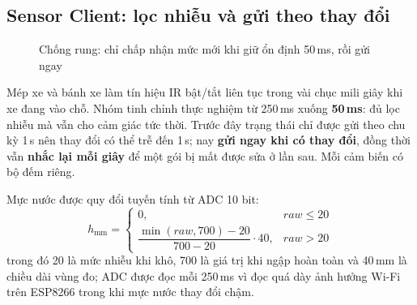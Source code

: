 \subsection{Sensor Client: lọc nhiễu và gửi theo thay đổi}
\begin{figure}[H]
\centering
{}
\caption{Chống rung: chỉ chấp nhận mức mới khi giữ ổn định 50\,ms, rồi gửi ngay}\label{fig:debounce}
\end{figure}

\begin{lydo}
Mép xe và bánh xe làm tín hiệu IR bật/tắt liên tục trong vài chục mili giây khi xe
đang vào chỗ. Nhóm tinh chỉnh thực nghiệm từ 250\,ms xuống \textbf{50\,ms}: đủ lọc nhiễu
mà vẫn cho cảm giác tức thời. Trước đây trạng thái chỉ được gửi theo chu kỳ 1\,s nên thay đổi
có thể trễ đến 1\,s; nay \textbf{gửi ngay khi có thay đổi}, đồng thời vẫn \textbf{nhắc
lại mỗi giây} để một gói bị mất được sửa ở lần sau. Mỗi cảm biến có bộ đếm riêng.
\end{lydo}

Mực nước được quy đổi tuyến tính từ ADC 10 bit:
\begin{equation}
  h_{\text{mm}} =
  \begin{cases}
  0, & raw \le 20 \\[2pt]
  \dfrac{\min(raw, 700) - 20}{700 - 20} \cdot 40, & raw > 20
  \end{cases}
\end{equation}
trong đó 20 là mức nhiễu khi khô, 700 là giá trị khi ngập hoàn toàn và 40\,mm là
chiều dài vùng đo; ADC được đọc mỗi 250\,ms vì đọc quá dày ảnh hưởng Wi-Fi trên
ESP8266 trong khi mực nước thay đổi chậm.

